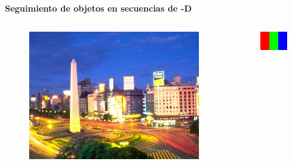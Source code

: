 \documentclass[]{beamer}
\begin{document}
\begin{frame}
    \textbf{Seguimiento de objetos en secuencias de -D}
    \begin{columns}
        \begin{column}{8cm}
            \begin{figure}[t]
                \centering
                \includegraphics[width=\textwidth]{img/rgb.jpg}
            \end{figure}
        \end{column}
        \begin{column}{3cm}
            \begin{figure}[t]
                \centering
                \includegraphics[width=\textwidth]{img/pixel.png}
            \end{figure}
        \end{column}
    \end{columns}

\end{frame}
\end{document}
